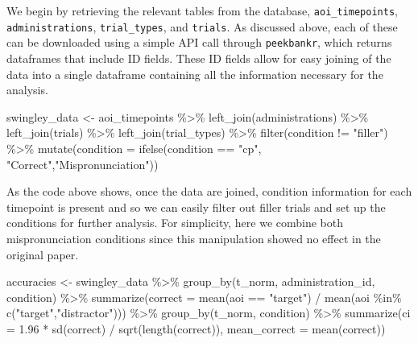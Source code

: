 \documentclass[
  english,
  man,floatsintext]{apa6}
\newenvironment{Shaded}{\begin{snugshade}}{\end{snugshade}}
\newcommand{\AttributeTok}[1]{\textcolor[rgb]{0.77,0.63,0.00}{#1}}
\newcommand{\FloatTok}[1]{\textcolor[rgb]{0.00,0.00,0.81}{#1}}
\newcommand{\FunctionTok}[1]{\textcolor[rgb]{0.00,0.00,0.00}{#1}}
\newcommand{\NormalTok}[1]{#1}
\newcommand{\OtherTok}[1]{\textcolor[rgb]{0.56,0.35,0.01}{#1}}
\newcommand{\SpecialCharTok}[1]{\textcolor[rgb]{0.00,0.00,0.00}{#1}}
\newcommand{\StringTok}[1]{\textcolor[rgb]{0.31,0.60,0.02}{#1}}
\begin{document}
We begin by retrieving the relevant tables from the database, \texttt{aoi\_timepoints}, \texttt{administrations}, \texttt{trial\_types}, and \texttt{trials}. As discussed above, each of these can be downloaded using a simple API call through \texttt{peekbankr}, which returns dataframes that include ID fields. These ID fields allow for easy joining of the data into a single dataframe containing all the information necessary for the analysis.

\begin{Shaded}
\begin{Highlighting}[]
\NormalTok{swingley\_data }\OtherTok{\textless{}{-}}\NormalTok{ aoi\_timepoints }\SpecialCharTok{\%\textgreater{}\%}
  \FunctionTok{left\_join}\NormalTok{(administrations) }\SpecialCharTok{\%\textgreater{}\%}
  \FunctionTok{left\_join}\NormalTok{(trials) }\SpecialCharTok{\%\textgreater{}\%}
  \FunctionTok{left\_join}\NormalTok{(trial\_types) }\SpecialCharTok{\%\textgreater{}\%}
  \FunctionTok{filter}\NormalTok{(condition }\SpecialCharTok{!=} \StringTok{"filler"}\NormalTok{) }\SpecialCharTok{\%\textgreater{}\%}
  \FunctionTok{mutate}\NormalTok{(}\AttributeTok{condition =} \FunctionTok{ifelse}\NormalTok{(condition }\SpecialCharTok{==} \StringTok{"cp"}\NormalTok{, }\StringTok{"Correct"}\NormalTok{,}\StringTok{"Mispronunciation"}\NormalTok{))}
\end{Highlighting}
\end{Shaded}

As the code above shows, once the data are joined, condition information for each timepoint is present and so we can easily filter out filler trials and set up the conditions for further analysis. For simplicity, here we combine both mispronunciation conditions since this manipulation showed no effect in the original paper.

\begin{Shaded}
\begin{Highlighting}[]
\NormalTok{accuracies }\OtherTok{\textless{}{-}}\NormalTok{ swingley\_data  }\SpecialCharTok{\%\textgreater{}\%}
  \FunctionTok{group\_by}\NormalTok{(t\_norm, administration\_id, condition) }\SpecialCharTok{\%\textgreater{}\%} 
  \FunctionTok{summarize}\NormalTok{(}\AttributeTok{correct =} \FunctionTok{mean}\NormalTok{(aoi }\SpecialCharTok{==} \StringTok{"target"}\NormalTok{) }\SpecialCharTok{/} 
              \FunctionTok{mean}\NormalTok{(aoi }\SpecialCharTok{\%in\%} \FunctionTok{c}\NormalTok{(}\StringTok{"target"}\NormalTok{,}\StringTok{"distractor"}\NormalTok{))) }\SpecialCharTok{\%\textgreater{}\%}
  \FunctionTok{group\_by}\NormalTok{(t\_norm, condition) }\SpecialCharTok{\%\textgreater{}\%} 
  \FunctionTok{summarize}\NormalTok{(}\AttributeTok{ci =} \FloatTok{1.96} \SpecialCharTok{*} \FunctionTok{sd}\NormalTok{(correct) }\SpecialCharTok{/} \FunctionTok{sqrt}\NormalTok{(}\FunctionTok{length}\NormalTok{(correct)), }
            \AttributeTok{mean\_correct =} \FunctionTok{mean}\NormalTok{(correct))}
\end{Highlighting}
\end{Shaded}
\end{document}
